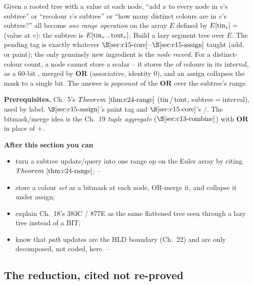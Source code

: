 \begin{topicintro}
Given a rooted tree with a value at each node, ``add \(x\) to every node in \(v\)'s subtree'' or ``recolour \(v\)'s subtree'' or ``how many distinct colours are in \(v\)'s subtree?'' all become \emph{one range operation} on the array \(E\) defined by \(E[\operatorname{tin}_v]=\) (value at \(v\)): the subtree is \(E[\operatorname{tin}_v..\operatorname{tout}_v]\).  Build a lazy segment tree over \(E\).  The pending tag is exactly whatever \(\secref{c15-core}\)--\(\secref{c15-assign}\) taught (add, or paint); the only genuinely new ingredient is the \emph{node record}.  For a distinct-colour count, a node cannot store a scalar -- it stores the  of colours in its interval, as a 60-bit , merged by \(\mathbf{OR}\) (associative, identity \(0\)), and an assign collapses the mask to a single bit.  The answer is \(\mathit{popcount}\) of the \(\mathbf{OR}\) over the subtree's range.

\textbf{Prerequisites.} Ch.~5's \(\thmref{c24-range}\) (\(\operatorname{tin}/\operatorname{tout}\), subtree\(=\)interval), used by label.  \(\secref{c15-assign}\)'s paint tag and \(\secref{c15-core}\)'s /.  The bitmask/merge idea is the Ch.~19 \emph{tuple aggregate} (\(\secref{c13-combine}\)) with \(\mathbf{OR}\) in place of \(+\).

\textbf{After this section you can}
\begin{itemize}[nosep]
  \item turn a subtree update/query into one range op on the Euler array by citing \(\thmref{c24-range}\); \hfill{}--
  \item store a colour \emph{set} as a bitmask at each node, OR-merge it, and collapse it under assign; \hfill{}
  \item explain Ch.~18's 383C / 877E as the same flattened tree seen through a lazy tree instead of a BIT; \hfill{}
  \item know that \emph{path} updates are the HLD boundary (Ch.~22) and are only decomposed, not coded, here. \hfill{}--
\end{itemize}
\end{topicintro}

\subsection{The reduction, cited not re-proved}

